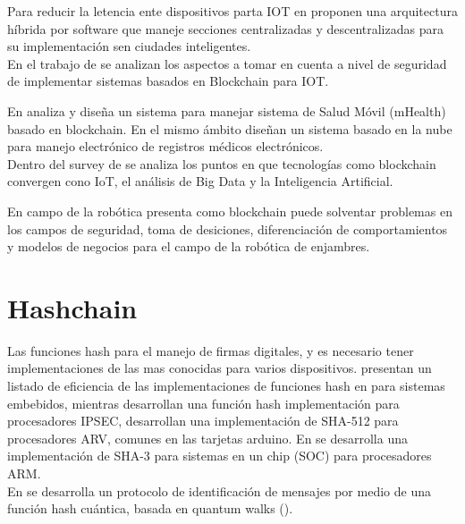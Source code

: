 \documentclass[10pt,letterpaper]{article}
\begin{document}
Para reducir la letencia ente dispositivos parta IOT en \cite{sharma2018blockchain} proponen una arquitectura híbrida por software que maneje secciones centralizadas y descentralizadas para su implementación sen ciudades inteligentes.\\

En el trabajo de \cite{khan2018iot} se analizan los aspectos a tomar en cuenta a nivel de seguridad de implementar sistemas basados en Blockchain para IOT.


En \cite{motohashi2019secure} analiza y diseña un sistema para manejar sistema de Salud Móvil (mHealth) basado en blockchain. En el mismo ámbito \cite{cao2019cloud} diseñan un sistema basado en la nube para manejo electrónico de registros médicos electrónicos.\\

Dentro del survey de \cite{rabah2018convergence} se analiza los puntos en que tecnologías como blockchain convergen cono IoT, el análisis de Big Data y la Inteligencia Artificial.

En campo de la robótica \cite{ferrer2018blockchain} presenta como blockchain puede solventar problemas en los campos de seguridad, toma de desiciones, diferenciación de comportamientos y modelos de negocios para el campo de la robótica de enjambres.\\

\section{Hashchain}

Las funciones hash para el manejo de firmas digitales, y es necesario tener implementaciones de las mas conocidas para varios dispositivos. \cite{osvik2012fast} presentan un listado de eficiencia de las implementaciones de funciones hash en para sistemas embebidos, mientras \cite{kyu2002efficient} desarrollan una función hash implementación para procesadores IPSEC, \cite{cheng2018efficient} desarrollan una implementación de SHA-512 para procesadores ARV, comunes en las tarjetas arduino. En \cite{kim2018optimized} se desarrolla una implementación de SHA-3 para sistemas en un chip (SOC) para procesadores ARM.\\



En \cite{wang2019message} se desarrolla un protocolo de identificación de mensajes por medio de una función hash cuántica, basada en quantum walks (\cite{li2013discrete}).\\
\end{document}
